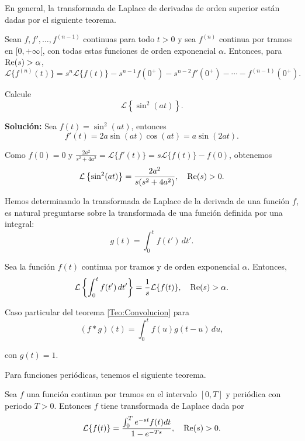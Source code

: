 En general, la transformada de Laplace de derivadas de orden superior están dadas por el siguiente teorema.

\begin{teorema}
 Sean $f, f', \dots, f^{(n-1)}$ continuas para todo $t>0$ y sea $f^{(n)}$ continua por tramos en $[0,+\infty[$, con todas estas funciones de orden exponencial $\alpha$. Entonces, para $\operatorname{Re}(s) > \alpha$,
$$\mathcal{L}\{f^{(n)}(t)\} = s^n \mathcal{L}\{f(t)\} - s^{n-1} f(0^+) - s^{n-2} f'(0^+) - \cdots - f^{(n-1)}(0^+). \label{LaplaceDerivada}$$

\end{teorema}

\begin{ejemplo}
Calcule 
$$\mathcal{L}\left\{\sin^2(at)\right\}.$$   

\textbf{Solución:} Sea $f(t) = \sin^2(at)$, entonces
$$f'(t) = 2a \sin(at) \cos(at) = a \sin(2at).$$

Como $f(0) = 0$ y $\frac{2a^2}{s^2+4a^2} = \mathcal{L}\{f'(t)\} = s \mathcal{L}\{f(t)\} - f(0)$, obtenemos
$$\mathcal{L}\left\{\sin^2(at)\right\} = \frac{2a^2}{s(s^2+4a^2)}, \quad \operatorname{Re}(s) > 0.$$
\end{ejemplo}

Hemos determinando la transformada de Laplace de la derivada de una función $f$, es natural preguntarse sobre la transformada de una función definida por una integral:
$$g(t) = \int_0^t f(t') \,dt'.$$

\begin{teorema}
     Sea la función $f(t)$ continua por tramos y de orden exponencial $\alpha$. Entonces,
     $$\mathcal{L} \left\{ \int_0^t f(t') \,dt'\right\} = \frac{1}{s} \mathcal{L}\{f(t)\}, \quad \operatorname{Re}(s) > \alpha.$$
\end{teorema}

\begin{demo}
Caso particular del teorema \ref{Teo:Convolucion} para 
$$(f * g)(t) = \int_0^t f(u) g(t-u) \,du,$$

con $g(t) = 1$.
\end{demo}

Para funciones periódicas, tenemos el siguiente teorema.

\begin{teorema}
 Sea $f$ una función continua por tramos en el intervalo $[0,T]$ y periódica con periodo $T>0$. Entonces $f$ tiene transformada de Laplace dada por
\begin{equation*}
\mathcal{L}\{f(t)\} = \frac{\int_0^T e^{-st} f(t) dt}{1-e^{-Ts}}, \quad \operatorname{Re}(s) > 0.
\end{equation*}
   
\end{teorema}

